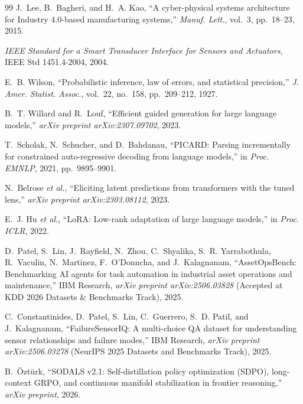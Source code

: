 \documentclass[journal]{IEEEtran}
\begin{document}
\begin{thebibliography}{99}
J.~Lee, B.~Bagheri, and H.~A. Kao, ``A cyber-physical systems architecture for Industry 4.0-based manufacturing systems,'' \textit{Manuf. Lett.}, vol.~3, pp.~18--23, 2015.

\textit{IEEE Standard for a Smart Transducer Interface for Sensors and Actuators}, IEEE Std 1451.4-2004, 2004.

E.~B. Wilson, ``Probabilistic inference, law of errors, and statistical precision,'' \textit{J. Amer. Statist. Assoc.}, vol.~22, no.~158, pp.~209--212, 1927.

B.~T. Willard and R.~Louf, ``Efficient guided generation for large language models,'' \textit{arXiv preprint arXiv:2307.09702}, 2023.

T.~Scholak, N.~Schucher, and D.~Bahdanau, ``PICARD: Parsing incrementally for constrained auto-regressive decoding from language models,'' in \textit{Proc. EMNLP}, 2021, pp.~9895--9901.

N.~Belrose \textit{et al.}, ``Eliciting latent predictions from transformers with the tuned lens,'' \textit{arXiv preprint arXiv:2303.08112}, 2023.

E.~J. Hu \textit{et al.}, ``LoRA: Low-rank adaptation of large language models,'' in \textit{Proc. ICLR}, 2022.

D.~Patel, S.~Lin, J.~Rayfield, N.~Zhou, C.~Shyalika, S.~R. Yarrabothula, R.~Vaculin, N.~Martinez, F.~O'Donncha, and J.~Kalagnanam, ``AssetOpsBench: Benchmarking AI agents for task automation in industrial asset operations and maintenance,'' IBM Research, \textit{arXiv preprint arXiv:2506.03828} (Accepted at KDD 2026 Datasets \& Benchmarks Track), 2025.

C.~Constantinides, D.~Patel, S.~Lin, C.~Guerrero, S.~D. Patil, and J.~Kalagnanam, ``FailureSensorIQ: A multi-choice QA dataset for understanding sensor relationships and failure modes,'' IBM Research, \textit{arXiv preprint arXiv:2506.03278} (NeurIPS 2025 Datasets and Benchmarks Track), 2025.

B.~\"Ozt\"urk, ``SODALS v2.1: Self-distillation policy optimization (SDPO), long-context GRPO, and continuous manifold stabilization in frontier reasoning,'' \textit{arXiv preprint}, 2026.

\end{thebibliography}
\end{document}

